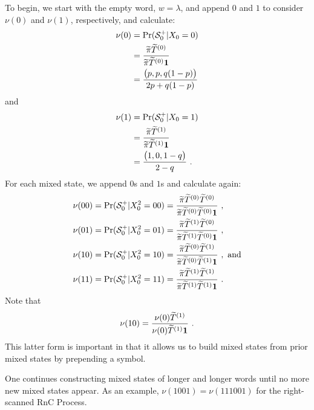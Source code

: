 To begin, we start with the empty word, $w=\lambda$, and append $0$ and $1$
to consider $\nu(0)$ and $\nu(1)$, respectively, and calculate:
\begin{align*}
\nu(0) 
  &= \Pr({\mathcal{S}}^{+}_0|{X}_0=0)  \\
  & = \frac{\widetilde{\pi} \widetilde{T}^{(0)}}
 	{\widetilde{\pi} \widetilde{T}^{(0)} \mathbf{1}} \\
  &= \frac{\bigl(p, p, q(1-p)\bigr)}{2p + q(1-p)}
\end{align*}
and
\begin{align*}
\nu(1)
  &= \Pr({\mathcal{S}}^{+}_0|{X}_0=1)  \\
  &= \frac{\widetilde{\pi} \widetilde{T}^{(1)}}
  	{\widetilde{\pi} \widetilde{T}^{(1)} \mathbf{1}} \\
  &= \frac{\bigl( 1, 0, 1-q\bigr)}{2-q} ~.
\end{align*}
For each mixed state, we append $0$s and $1$s and calculate again:
\begin{align*}
\nu(00)
&= \Pr({\mathcal{S}}^{+}_0|{X}_0^2=00) 
 = \frac{\widetilde{\pi} \widetilde{T}^{(0)} \widetilde{T}^{(0)}}
        {\widetilde{\pi} \widetilde{T}^{(0)} \widetilde{T}^{(0)} \mathbf{1}} ~,\\
\nu(01)
&= \Pr({\mathcal{S}}^{+}_0|{X}_0^2=01) 
 = \frac{\widetilde{\pi} \widetilde{T}^{(1)} \widetilde{T}^{(0)}}
        {\widetilde{\pi} \widetilde{T}^{(1)} \widetilde{T}^{(0)} \mathbf{1}} ~,\\
\nu(10)
&= \Pr({\mathcal{S}}^{+}_0|{X}_0^2=10) 
 = \frac{\widetilde{\pi} \widetilde{T}^{(0)} \widetilde{T}^{(1)}}
        {\widetilde{\pi} \widetilde{T}^{(0)} \widetilde{T}^{(1)} \mathbf{1}} ~,
		\mathrm{~and} \\
\nu(11)
&= \Pr({\mathcal{S}}^{+}_0|{X}_0^2=11) 
 = \frac{\widetilde{\pi} \widetilde{T}^{(1)} \widetilde{T}^{(1)}}
        {\widetilde{\pi} \widetilde{T}^{(1)} \widetilde{T}^{(1)} \mathbf{1} }~.
\end{align*}
Note that 
\begin{equation}
\nu(10)
  = \frac{\nu(0)\widetilde{T}^{(1)}}{\nu(0) \widetilde{T}^{(1)}\mathbf{1}} ~.
\end{equation}
This latter form is important in that it allows us to build mixed states from
prior mixed states by prepending a symbol. 

One continues constructing mixed states of longer and longer words until no
more new mixed states appear. As an example, $\nu(1001) = \nu(111001)$ for 
the right-scanned RnC Process.

